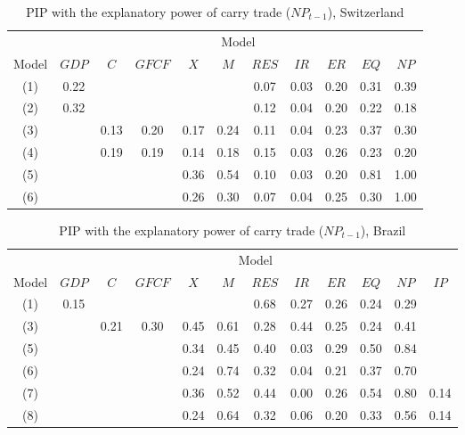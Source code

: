 \documentclass[a4paper, twoside]{templates/ociamthesis}
\begin{document}
\begin{table}[!ht]

\caption{\label{tab:Table54CH}PIP with the explanatory power of carry trade ($NP_{t-1}$), Switzerland}
\centering
\fontsize{9}{11}\selectfont
\begin{tabular}[t]{ccccccccccc}
\toprule
\multicolumn{1}{c}{ } & \multicolumn{10}{c}{Model} \\
\cmidrule(l{3pt}r{3pt}){2-11}
Model & $GDP$ & $C$ & $GFCF$ & $X$ & $M$ & $RES$ & $IR$ & $ER$ & $EQ$ & $NP$\\
\midrule
(1) & 0.22 &  &  &  &  & 0.07 & 0.03 & 0.20 & 0.31 & 0.39\\
(2) & 0.32 &  &  &  &  & 0.12 & 0.04 & 0.20 & 0.22 & 0.18\\
(3) &  & 0.13 & 0.20 & 0.17 & 0.24 & 0.11 & 0.04 & 0.23 & 0.37 & 0.30\\
(4) &  & 0.19 & 0.19 & 0.14 & 0.18 & 0.15 & 0.03 & 0.26 & 0.23 & 0.20\\
(5) &  &  &  & 0.36 & 0.54 & 0.10 & 0.03 & 0.20 & 0.81 & 1.00\\
(6) &  &  &  & 0.26 & 0.30 & 0.07 & 0.04 & 0.25 & 0.30 & 1.00\\
\bottomrule
\end{tabular}
\end{table}

\begin{table}[!ht]

\caption{\label{tab:Table54BR}PIP with the explanatory power of carry trade ($NP_{t-1}$), Brazil}
\centering
\fontsize{9}{11}\selectfont
\begin{tabular}[t]{cccccccccccc}
\toprule
\multicolumn{1}{c}{ } & \multicolumn{11}{c}{Model} \\
\cmidrule(l{3pt}r{3pt}){2-12}
Model & $GDP$ & $C$ & $GFCF$ & $X$ & $M$ & $RES$ & $IR$ & $ER$ & $EQ$ & $NP$ & $IP$\\
\midrule
(1) & 0.15 &  &  &  &  & 0.68 & 0.27 & 0.26 & 0.24 & 0.29 & \\
(3) &  & 0.21 & 0.30 & 0.45 & 0.61 & 0.28 & 0.44 & 0.25 & 0.24 & 0.41 & \\
(5) &  &  &  & 0.34 & 0.45 & 0.40 & 0.03 & 0.29 & 0.50 & 0.84 & \\
(6) &  &  &  & 0.24 & 0.74 & 0.32 & 0.04 & 0.21 & 0.37 & 0.70 & \\
(7) &  &  &  & 0.36 & 0.52 & 0.44 & 0.00 & 0.26 & 0.54 & 0.80 & 0.14\\
(8) &  &  &  & 0.24 & 0.64 & 0.32 & 0.06 & 0.20 & 0.33 & 0.56 & 0.14\\
\bottomrule
\end{tabular}
\end{table}
\end{document}
